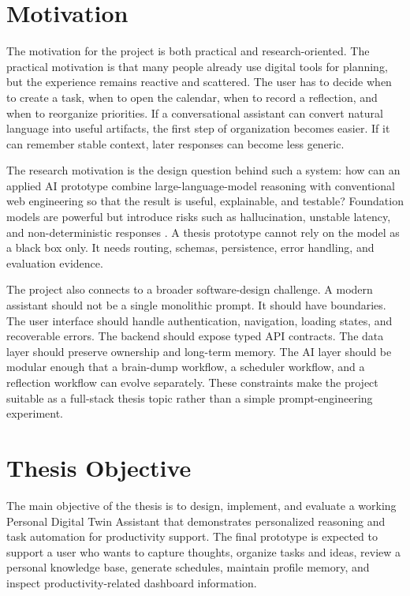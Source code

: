 \section{Motivation}

The motivation for the project is both practical and research-oriented. The practical motivation is that many people already use digital tools for planning, but the experience remains reactive and scattered. The user has to decide when to create a task, when to open the calendar, when to record a reflection, and when to reorganize priorities. If a conversational assistant can convert natural language into useful artifacts, the first step of organization becomes easier. If it can remember stable context, later responses can become less generic.

The research motivation is the design question behind such a system: how can an applied AI prototype combine large-language-model reasoning with conventional web engineering so that the result is useful, explainable, and testable? Foundation models are powerful but introduce risks such as hallucination, unstable latency, and non-deterministic responses \cite{bommasani2021foundation}. A thesis prototype cannot rely on the model as a black box only. It needs routing, schemas, persistence, error handling, and evaluation evidence.

The project also connects to a broader software-design challenge. A modern assistant should not be a single monolithic prompt. It should have boundaries. The user interface should handle authentication, navigation, loading states, and recoverable errors. The backend should expose typed API contracts. The data layer should preserve ownership and long-term memory. The AI layer should be modular enough that a brain-dump workflow, a scheduler workflow, and a reflection workflow can evolve separately. These constraints make the project suitable as a full-stack thesis topic rather than a simple prompt-engineering experiment.

\section{Thesis Objective}

The main objective of the thesis is to design, implement, and evaluate a working Personal Digital Twin Assistant that demonstrates personalized reasoning and task automation for productivity support. The final prototype is expected to support a user who wants to capture thoughts, organize tasks and ideas, review a personal knowledge base, generate schedules, maintain profile memory, and inspect productivity-related dashboard information.


